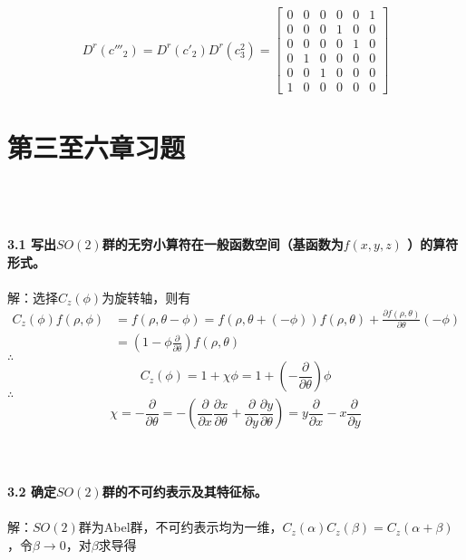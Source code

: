 \documentclass[12pt]{article}
\numberwithin{equation}{section}	 %
\begin{document}
\begin{spacing}{1.5}
\begin{equation}
D^{r}(c'''_{2}) = D^{r}(c'_{2}) D^{r}(c^{2}_{3}) = \left[\begin{matrix}0 & 0 & 0 & 0 & 0 & 1 \\ 0 & 0 & 0 & 1 & 0 & 0 \\ 0 & 0 & 0 & 0 & 1 & 0\\ 0 & 1 & 0 & 0 & 0 & 0 \\ 0 & 0 & 1 & 0 & 0 & 0 \\ 1 & 0 & 0 & 0 & 0 & 0 \end{matrix}\right]
\end{equation}


\newpage
\section{第三至六章习题}
~\\
~\\
~\\
\textbf{3.1 \quad 写出$SO(2)$群的无穷小算符在一般函数空间（基函数为$f(x,y,z)$ ）的算符形式。}\\
~\\
解：选择$C_{z}(\phi)$为旋转轴，则有
\begin{align*}
C_{z}(\phi)f(\rho,\phi) &= f(\rho,\theta-\phi) = f(\rho,\theta+(-\phi)) f(\rho,\theta) + \frac{\partial f(\rho,\theta)}{\partial\theta}(-\phi) \\
&= \left( 1-\phi\frac{\partial}{\partial\theta} \right) f(\rho,\theta)
\end{align*}
$\therefore$
\begin{equation}
C_{z}(\phi) = 1 + \chi\phi = 1 + \left(-\frac{\partial}{\partial\theta}\right)\phi
\end{equation}
$\therefore$
\begin{equation}
\chi = -\frac{\partial}{\partial\theta} = -\left( \frac{\partial}{\partial x}\frac{\partial x}{\partial\theta}+\frac{\partial}{\partial y}\frac{\partial y}{\partial\theta} \right) = y\frac{\partial}{\partial x} - x\frac{\partial}{\partial y}
\end{equation}
~\\
~\\
~\\
\textbf{3.2 \quad 确定$SO(2)$群的不可约表示及其特征标。}\\
~\\
解：$SO(2)$群为Abel群，不可约表示均为一维，$C_{z}(\alpha)C_{z}(\beta)=C_{z}(\alpha+\beta)$，令$\beta\rightarrow0$，对$\beta$求导得
\begin{align*}

\end{align*}
\end{spacing}
\end{document}
